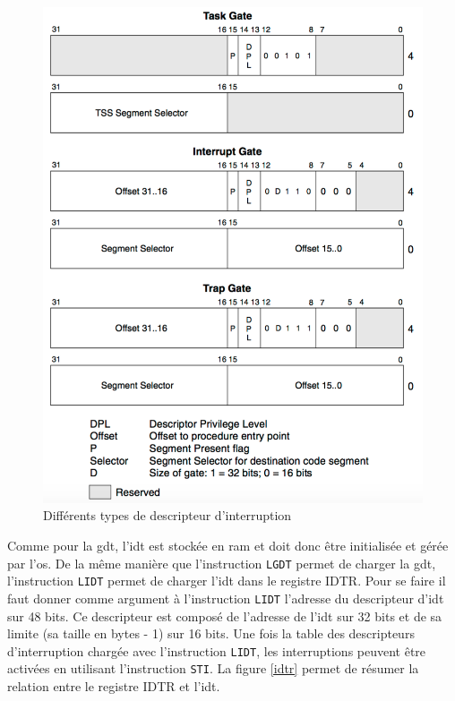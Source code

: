 \begin{figure}[!h]
  \centering
  \includegraphics[scale=0.75]{images/idt_entry.png}
  \caption{Différents types de descripteur d'interruption}
  \label{idt_entry}
\end{figure}

Comme pour la \acrshort{gdt}, l'\acrshort{idt} est stockée en \acrshort{ram}
et doit donc être initialisée et gérée par l'\acrshort{os}. De la même manière
que l'instruction \texttt{LGDT} permet de charger la \acrshort{gdt},
l'instruction \texttt{LIDT} permet de charger l'\acrshort{idt} dans le
registre IDTR. Pour se faire il faut donner comme argument à l'instruction 
\texttt{LIDT} l'adresse du descripteur d'\acrshort{idt} sur 48 bits.
Ce descripteur est composé de l'adresse de l'\acrshort{idt} sur 32 bits et de sa
limite (sa taille en bytes - 1) sur 16 bits. Une fois la table des descripteurs
d'interruption chargée avec l'instruction \texttt{LIDT}, les interruptions
peuvent être activées en utilisant l'instruction \texttt{STI}. La figure
\ref{idtr} permet de résumer la relation entre le registre IDTR et l'\acrshort{idt}.

